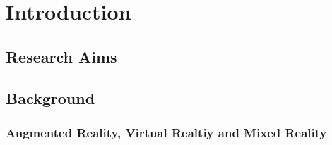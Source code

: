 \chapter{Introduction}

\section{Research Aims}

%

\section{Background}

\subsection{Augmented Reality, Virtual Realtiy and Mixed Reality}

